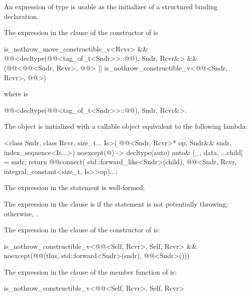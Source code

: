 \pnum
An expression of type  is usable as
the initializer of a structured binding declaration.

\pnum
The expression in the  clause of
the constructor of  is
\begin{codeblock}
is_nothrow_move_constructible_v<Rcvr> &&
@@<decltype(@@<tag_of_t<Sndr>>::@@), Sndr, Rcvr&> &&
(@@<@@<Sndr, Rcvr>, @@> ||
 is_nothrow_constructible_v<@@<Sndr, Rcvr>, @@>)
\end{codeblock}
where  is
\begin{codeblock}
@@<decltype(@@<tag_of_t<Sndr>>::@@), Sndr, Rcvr&>.
\end{codeblock}

\pnum
The object  is initialized with
a callable object equivalent to the following lambda:
\begin{itemdecl}
[]<class Sndr, class Rcvr, size_t... Is>(
  @@<Sndr, Rcvr>* op, Sndr&& sndr, index_sequence<Is...>) noexcept(@\seebelow@)
    -> decltype(auto) {
    auto& [_, data, ...child] = sndr;
    return @@{connect(
      std::forward_like<Sndr>(child),
      @@<Sndr, Rcvr, integral_constant<size_t, Is>>{op})...};
  }
\end{itemdecl}

\begin{itemdescr}
\pnum
\constraints
The expression in the  statement is well-formed.

\pnum
\remarks
The expression in the  clause is 
if the  statement is not potentially throwing;
otherwise, .
\end{itemdescr}

\pnum
The expression in the  clause of
the constructor of  is:
\begin{codeblock}
is_nothrow_constructible_v<@@<Self, Rcvr>, Self, Rcvr> &&
noexcept(@@(this, std::forward<Sndr>(sndr), @@<Sndr>()))
\end{codeblock}

\pnum
The expression in the  clause of
the  member function of  is:
\begin{codeblock}
is_nothrow_constructible_v<@@<Self, Rcvr>, Self, Rcvr>
\end{codeblock}

